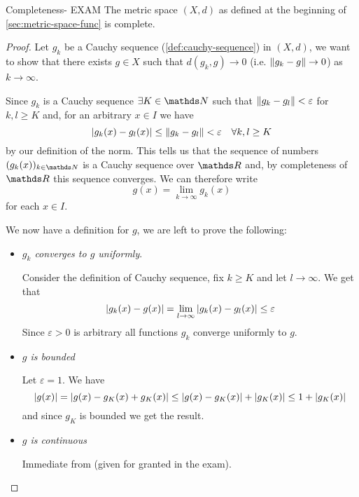 \documentclass[12pt]{extarticle}
\begin{document}
\begin{theorem}{Completeness- EXAM}{}
    The metric space $(X, d)$ as defined at the beginning of \cref{sec:metric-space-func} is complete.
\end{theorem}
\begin{proof}
    Let $g_k$ be a Cauchy sequence (\cref{def:cauchy-sequence}) in $(X, d)$,
    we want to show that there exists $g \in X$ such that $d(g_k, g) \to 0$ (i.e. $\norm{g_k - g} \to 0$) as $k \to \infty$.

    Since $g_k$ is a Cauchy sequence $\exists K \in \N$ such that $\norm{g_k - g_l} < \varepsilon$ for $k, l \geq K$ and, for an arbitrary $x \in I$ we have
    \begin{equation}
        \abs{g_k(x)-g_l(x)} \leq \norm{g_k - g_l} < \varepsilon \quad \forall k, l \geq K
    \end{equation}
    by our definition of the norm.
    This tells us that the sequence of numbers $(g_k(x))_{k \in \N}$ is a Cauchy sequence over $\R$ and, by completeness of $\R$ this sequence converges.
    We can therefore write
    \begin{equation}
        g(x) = \lim_{k \to \infty} g_k(x)
    \end{equation}
    for each $x \in I$.

    We now have a definition for $g$, we are left to prove the following:
    \begin{itemize}
        \item \emph{$g_k$ converges to $g$ uniformly}.

              Consider the definition of Cauchy sequence, fix $k \geq K$ and let $l \to \infty$.
              We get that
              \begin{equation}
                  \abs{g_k(x) - g(x)} = \lim_{l \to \infty} \abs{g_k(x) - g_l(x)} \leq \varepsilon
              \end{equation}
              Since $\varepsilon > 0$ is arbitrary all functions $g_k$ converge uniformly to $g$.

        \item \emph{$g$ is bounded}

              Let $\varepsilon = 1$.
              We have
              \begin{equation}
                  \abs{g(x)} = \abs{g(x) - g_K(x) + g_K(x)} \leq \abs{g(x) - g_K(x)} + \abs{g_K(x)} \leq 1 + \abs{g_K(x)}
              \end{equation}
              and since $g_K$ is bounded we get the result.

        \item \emph{$g$ is continuous}

              Immediate from 
              (given for granted in the exam).
    \end{itemize}
\end{proof}
\end{document}
